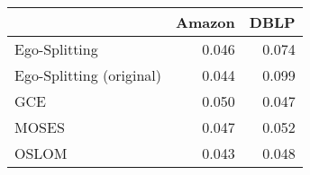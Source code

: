 \begin{tabular}{lrr}
\toprule
{} & Amazon &  DBLP \\
\midrule
Ego-Splitting            &  0.046 & 0.074 \\
Ego-Splitting (original) &  0.044 & 0.099 \\
GCE                      &  0.050 & 0.047 \\
MOSES                    &  0.047 & 0.052 \\
OSLOM                    &  0.043 & 0.048 \\
\bottomrule
\end{tabular}
